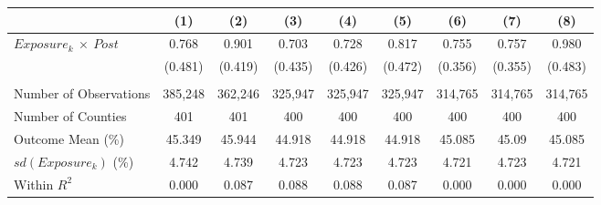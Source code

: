 \begin{tabular}{l*{1}cccccccc}
\toprule
& \multicolumn{1}{c}{(1)}
& \multicolumn{1}{c}{(2)}
& \multicolumn{1}{c}{(3)}
& \multicolumn{1}{c}{(4)}
& \multicolumn{1}{c}{(5)}
& \multicolumn{1}{c}{(6)}
& \multicolumn{1}{c}{(7)}
& \multicolumn{1}{c}{(8)}
\\ 



\midrule

$ Exposure_{k}\ \times \ Post $&       0.768         &       0.901\sym{**} &       0.703         &       0.728\sym{*}  & 0.817\sym{*}  &       0.755\sym{**} &       0.757\sym{**} &       0.980\sym{**} \\
           &     (0.481)         &     (0.419)         &     (0.435)         &     (0.426)         &     (0.472)         &     (0.356)         &     (0.355)         &     (0.483)         \\
\\
Number of Observations&     385,248         &     362,246         &     325,947         &     325,947         &     325,947         &     314,765         &     314,765         &     314,765         \\
Number of Counties&         401         &         401         &         400         &         400         &         400   &         400         &         400         &         400         \\
Outcome Mean (\%)&      45.349         &      45.944         &      44.918         &      44.918         &      44.918    &      45.085         &       45.09         &      45.085         \\
$ sd\left(Exposure_k\right) $ (\%)&       4.742         &       4.739         &       4.723         &       4.723         &       4.723         &       4.721         &       4.723         &       4.721         \\
Within $ R^2 $&       0.000         &       0.087         &       0.088         &       0.088         &       0.087       &       0.000         &       0.000         &       0.000         \\



\midrule


\end{tabular}
